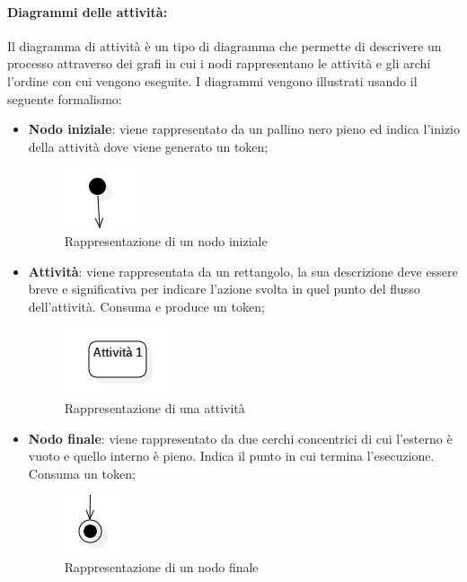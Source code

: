 \paragraph{Diagrammi delle attività:}\label{ProcessiPrimariProgettazioneUMLDiagrammiDellAttività}
Il diagramma di attività è un tipo di diagramma che permette di descrivere un processo attraverso dei grafi in cui i nodi rappresentano le attività e gli archi l'ordine con cui vengono eseguite. I diagrammi vengono illustrati usando il seguente formalismo:
\begin{itemize}
	\item \textbf{Nodo iniziale}: viene rappresentato da un pallino nero pieno ed indica l'inizio della attività dove viene generato un token;
	\begin{figure}[H]
		\centering\includegraphics{../immagini/normeUML/nodoIni.png}
		\caption{Rappresentazione di un nodo iniziale}
	\end{figure}
	\item \textbf{Attività}: viene rappresentata da un rettangolo, la sua descrizione deve essere breve e significativa per indicare l'azione svolta in quel punto del flusso dell'attività. Consuma e produce un token;
	\begin{figure}[H]
		\centering\includegraphics{../immagini/normeUML/attivita.png}
		\caption{Rappresentazione di una attività}
	\end{figure}
	\item \textbf{Nodo finale}: viene rappresentato da due cerchi concentrici di cui l'esterno è vuoto e quello interno è pieno. Indica il punto in cui termina l'esecuzione. Consuma un token;
	\begin{figure}[H]
		\centering\includegraphics{../immagini/normeUML/nodoFine.png}
		\caption{Rappresentazione di un nodo finale}
	\end{figure}

\end{itemize}
